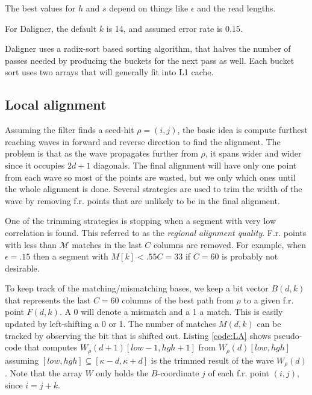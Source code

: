 \documentclass[../thesis.tex]{subfiles}
\begin{document}

The best values for $h$ and $s$ depend on things like $\epsilon$ and the read lengths.

For Daligner, the default $k$ is 14, and assumed error rate is $0.15$.

Daligner uses a radix-sort based sorting algorithm, that halves the number of passes needed by producing the buckets for the next pass as well.
Each bucket sort uses two arrays that will generally fit into L1 cache.

\subsection{Local alignment}
Assuming the filter finds a seed-hit $\rho = (i,j)$, the basic idea is compute furthest reaching waves in forward and reverse direction to find the alignment.
The problem is that as the wave propagates further from $\rho$, it spans wider and wider since it occupies $2d+1$ diagonals.
The final alignment will have only one point from each wave so most of the points are wasted, but we only which ones until the whole alignment is done.
Several strategies are used to trim the width of the wave by removing f.r. points that are unlikely to be in the final alignment.

One of the trimming strategies is stopping when a segment with very low correlation is found.
This referred to as the \textit{regional alignment quality}.
F.r. points with less than $\mathcal{M}$ matches in the last $C$ columns are removed.
For example, when $\epsilon = .15$ then a segment with $M[k] < .55C = 33$ if $C = 60$ is probably not desirable.

To keep track of the matching/mismatching bases, we keep a bit vector $B(d,k)$ that represents the last $C = 60$ columns of the best path from $\rho$ to a given f.r. point $F(d,k)$.
A 0 will denote a mismatch and a 1 a match.
This is easily updated by left-shifting a 0 or 1.
The number of matches $M(d,k)$ can be tracked by observing the bit that is shifted out.
Listing \ref{code:LA} shows pseudo-code that computes $W_\rho(d+1)[low-1,hgh+1]$ from $W_\rho(d)[low,hgh]$ assuming $[low,hgh] \subseteq [\kappa-d,\kappa+d]$ is the trimmed result of the wave $W_\rho(d)$.
Note that the array $W$ only holds the $B$-coordinate $j$ of each f.r. point $(i,j)$, since $i = j + k$.
\end{document}
